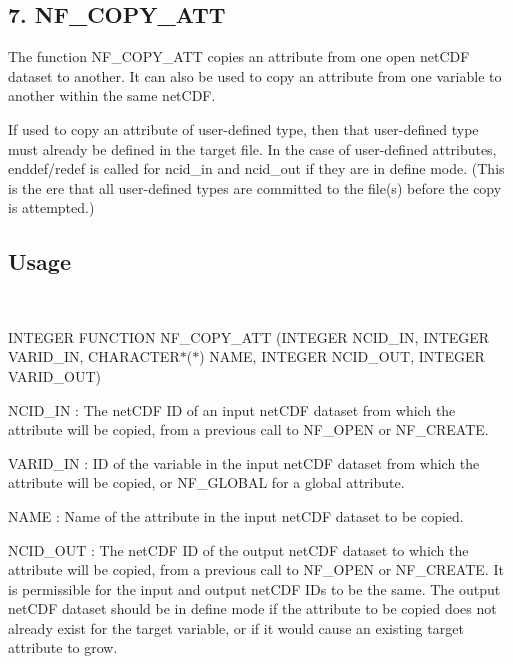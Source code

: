 \subsection*{7. N\+F\+\_\+\+C\+O\+P\+Y\+\_\+\+A\+TT }

The function N\+F\+\_\+\+C\+O\+P\+Y\+\_\+\+A\+TT copies an attribute from one open net\+C\+DF dataset to another. It can also be used to copy an attribute from one variable to another within the same net\+C\+DF.

If used to copy an attribute of user-\/defined type, then that user-\/defined type must already be defined in the target file. In the case of user-\/defined attributes, enddef/redef is called for ncid\+\_\+in and ncid\+\_\+out if they are in define mode. (This is the ere that all user-\/defined types are committed to the file(s) before the copy is attempted.)

\subsection*{Usage }

 

I\+N\+T\+E\+G\+ER F\+U\+N\+C\+T\+I\+ON N\+F\+\_\+\+C\+O\+P\+Y\+\_\+\+A\+TT (I\+N\+T\+E\+G\+ER N\+C\+I\+D\+\_\+\+IN, I\+N\+T\+E\+G\+ER V\+A\+R\+I\+D\+\_\+\+IN, C\+H\+A\+R\+A\+C\+T\+E\+R$\ast$($\ast$) N\+A\+ME, I\+N\+T\+E\+G\+ER N\+C\+I\+D\+\_\+\+O\+UT, I\+N\+T\+E\+G\+ER V\+A\+R\+I\+D\+\_\+\+O\+UT)

{\ttfamily N\+C\+I\+D\+\_\+\+IN} \+: The net\+C\+DF ID of an input net\+C\+DF dataset from which the attribute will be copied, from a previous call to N\+F\+\_\+\+O\+P\+EN or N\+F\+\_\+\+C\+R\+E\+A\+TE.

{\ttfamily V\+A\+R\+I\+D\+\_\+\+IN} \+: ID of the variable in the input net\+C\+DF dataset from which the attribute will be copied, or N\+F\+\_\+\+G\+L\+O\+B\+AL for a global attribute.

{\ttfamily N\+A\+ME} \+: Name of the attribute in the input net\+C\+DF dataset to be copied.

{\ttfamily N\+C\+I\+D\+\_\+\+O\+UT} \+: The net\+C\+DF ID of the output net\+C\+DF dataset to which the attribute will be copied, from a previous call to N\+F\+\_\+\+O\+P\+EN or N\+F\+\_\+\+C\+R\+E\+A\+TE. It is permissible for the input and output net\+C\+DF I\+Ds to be the same. The output net\+C\+DF dataset should be in define mode if the attribute to be copied does not already exist for the target variable, or if it would cause an existing target attribute to grow.

